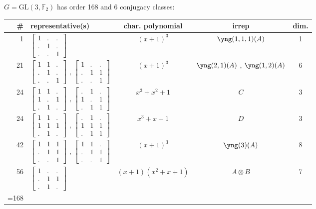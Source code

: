 \documentclass[11pt,oneside]{article}
\newcommand{\GL}{\mathrm{GL}}
\newcommand{\Field}{\mathbb{F}}
\newcommand{\tensor}{\otimes}
\begin{document}
$G=\GL(3,\Field_2)$ has order 168 and 6 conjugacy classes:
\begin{center}
\begin{tabular}{r|l|c|c|c}
\# & representative(s) & char. polynomial & irrep & dim. \\
\hline
 1 & $\begin{bmatrix}1&.&.\\.&1&.\\.&.&1\end{bmatrix}$ & $(x+1)^3$  
    & $\yng(1,1,1)(A)$ & 1 \\
21 & $\begin{bmatrix}1&1&.\\.&1&.\\.&.&1\end{bmatrix}$ ,
     $\begin{bmatrix}1&.&.\\.&1&1\\.&.&1\end{bmatrix}$ & $(x+1)^3$  
    & $\yng(2,1)(A)$ , $\yng(1,2)(A)$ & 6  \\
24 & 
$\begin{bmatrix}1&1&.\\1&.&1\\.&1&.\end{bmatrix}$
,
$\begin{bmatrix}.&1&.\\1&.&1\\.&1&1\end{bmatrix}$
& $x^3+x^2+1$      & $C$ & 3 \\
24 & 
$\begin{bmatrix}1&1&.\\1&1&1\\.&1&.\end{bmatrix}$
,
$\begin{bmatrix}.&1&.\\1&1&1\\.&1&1\end{bmatrix}$
& $x^3+x+1$        & $D$ & 3 \\
42 & $\begin{bmatrix}1&1&1\\.&1&1\\.&.&1\end{bmatrix}$
    ,  $\begin{bmatrix}1&1&.\\.&1&1\\.&.&1\end{bmatrix}$
    & $(x+1)^3$ 
    & $\yng(3)(A)$ & 8  \\
56 & $\begin{bmatrix}1&.&.\\.&1&1\\.&1&.\end{bmatrix}$ & $(x+1)(x^2+x+1)$
    & $A\tensor B$ & 7 \\
\hline
\strut =168 \\
\end{tabular}
\end{center}
\end{document}
